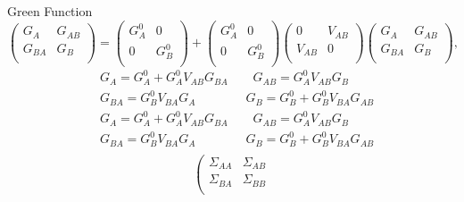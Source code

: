 \documentclass[handout,t]{beamer}
\begin{document}
\begin{frame}{Green Function}
	\begin{equation}
		\left( \begin{matrix}
			   {{G}_{A}} & {{G}_{AB}}  \\
			   {{G}_{BA}} & {{G}_{B}}  \\
			\end{matrix} \right)=\left( \begin{matrix}
			   G_{A}^{0} & 0  \\
			   0 & G_{B}^{0}  \\
			\end{matrix} \right)+\left( \begin{matrix}
			   G_{A}^{0} & 0  \\
			   0 & G_{B}^{0}  \\
			\end{matrix} \right)\left( \begin{matrix}
			   0 & {{V}_{AB}}  \\
			   {{V}_{AB}} & 0  \\
			\end{matrix} \right)\left( \begin{matrix}
			   {{G}_{A}} & {{G}_{AB}}  \\
			   {{G}_{BA}} & {{G}_{B}}  \\
			\end{matrix} \right),
	\end{equation}
	\begin{equation}
		\begin{split}
			  & {{G}_{A}}=G_{A}^{0}+G_{A}^{0}{{V}_{AB}}{{G}_{BA}}\qquad {{G}_{AB}}=G_{A}^{0}{{V}_{AB}}{{G}_{B}} \\ 
			 & {{G}_{BA}}=G_{B}^{0}{{V}_{BA}}{{G}_{A}}\qquad \qquad {{G}_{B}}=G_{B}^{0}+G_{B}^{0}{{V}_{BA}}{{G}_{AB}} \\ 
			 & {{G}_{A}}=G_{A}^{0}+G_{A}^{0}{{V}_{AB}}{{G}_{BA}}\qquad {{G}_{AB}}=G_{A}^{0}{{V}_{AB}}{{G}_{B}} \\ 
			& {{G}_{BA}}=G_{B}^{0}{{V}_{BA}}{{G}_{A}}\qquad \qquad {{G}_{B}}=G_{B}^{0}+G_{B}^{0}{{V}_{BA}}{{G}_{AB}} \\ 
		\end{split}
		\label{eq:greenselfenergy}
	\end{equation}
	\begin{equation}
		\left( \begin{matrix}
			   {{\Sigma }_{AA}} & {{\Sigma }_{AB}}  \\
			   {{\Sigma }_{BA}} & {{\Sigma }_{BB}}  \\

\end{matrix}
\end{equation}
\end{frame}
\end{document}
